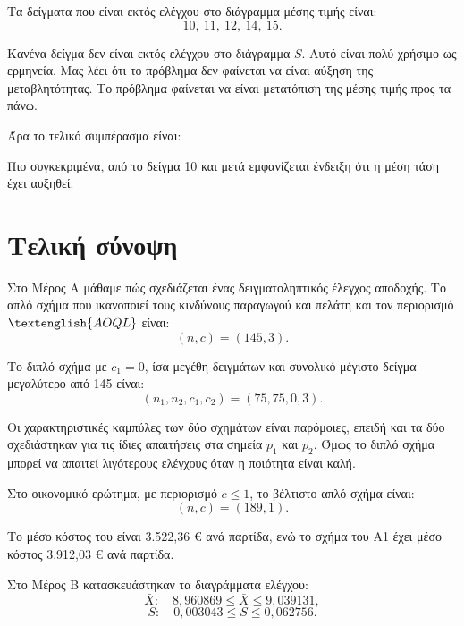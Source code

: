 \documentclass[12pt,a4paper]{article}
\newcommand{\AOQL}{\textenglish{AOQL}}
\begin{document}
Τα δείγματα που είναι εκτός ελέγχου στο διάγραμμα μέσης τιμής είναι:
\[
    10,\ 11,\ 12,\ 14,\ 15.
\]

Κανένα δείγμα δεν είναι εκτός ελέγχου στο διάγραμμα \(S\). Αυτό είναι πολύ
χρήσιμο ως ερμηνεία. Μας λέει ότι το πρόβλημα δεν φαίνεται να είναι αύξηση της
μεταβλητότητας. Το πρόβλημα φαίνεται να είναι μετατόπιση της μέσης τιμής προς
τα πάνω.

Άρα το τελικό συμπέρασμα είναι:

\begin{center}
\end{center}

Πιο συγκεκριμένα, από το δείγμα 10 και μετά εμφανίζεται ένδειξη ότι η μέση
τάση έχει αυξηθεί.

\newpage

\section{Τελική σύνοψη}

Στο Μέρος Α μάθαμε πώς σχεδιάζεται ένας δειγματοληπτικός έλεγχος αποδοχής.
Το απλό σχήμα που ικανοποιεί τους κινδύνους παραγωγού και πελάτη και τον
περιορισμό \(\AOQL\) είναι:
\[
    \boxed{(n,c)=(145,3)}.
\]

Το διπλό σχήμα με \(c_1=0\), ίσα μεγέθη δειγμάτων και συνολικό μέγιστο δείγμα
μεγαλύτερο από 145 είναι:
\[
    \boxed{(n_1,n_2,c_1,c_2)=(75,75,0,3)}.
\]

Οι χαρακτηριστικές καμπύλες των δύο σχημάτων είναι παρόμοιες, επειδή και τα
δύο σχεδιάστηκαν για τις ίδιες απαιτήσεις στα σημεία \(p_1\) και \(p_2\). Όμως
το διπλό σχήμα μπορεί να απαιτεί λιγότερους ελέγχους όταν η ποιότητα είναι
καλή.

Στο οικονομικό ερώτημα, με περιορισμό \(c\le 1\), το βέλτιστο απλό σχήμα είναι:
\[
    \boxed{(n,c)=(189,1)}.
\]

Το μέσο κόστος του είναι 3.522,36 € ανά παρτίδα, ενώ το σχήμα του Α1 έχει μέσο
κόστος 3.912,03 € ανά παρτίδα.

Στο Μέρος Β κατασκευάστηκαν τα διαγράμματα ελέγχου:
\[
    \bar X: \quad 8{,}960869 \le \bar X \le 9{,}039131,
\]
\[
    S: \quad 0{,}003043 \le S \le 0{,}062756.
\]
\end{document}
